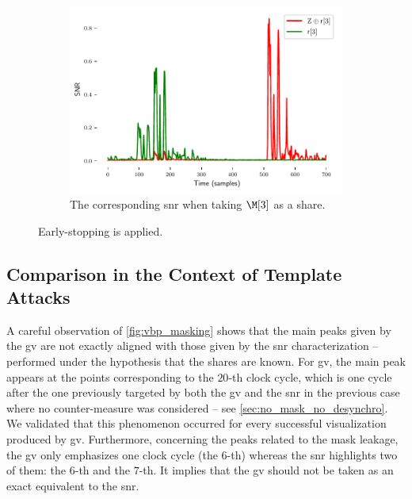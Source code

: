 \begin{figure}
    \begin{subfigure}{0.49 \textwidth}
        \includegraphics[width=\textwidth]{figures/ASCAD_700/snr_r3}
        \caption{The corresponding \gls{snr} when taking \(\M[3]\) as a share.}
        \label{fig:vbp_masking_snr_r3}
    \end{subfigure}
	\caption{Early-stopping is applied.}
	\label{fig:vbp_masking}
\end{figure}

\subsection{Comparison in the Context of Template Attacks}
\label{sec:comparison_with_snr}
A careful observation of \autoref{fig:vbp_masking} shows that the main peaks given by the \gls{gv} are not exactly aligned with those given by the \gls{snr} characterization -- performed under the hypothesis that the shares are known.
For \gls{gv}, the main peak appears at the points corresponding to the \(20\)-th clock cycle, which is one cycle after the one previously targeted by both the \gls{gv} and the \gls{snr} in the previous case where no counter-measure was considered -- see \autoref{sec:no_mask_no_desynchro}.
We validated that this phenomenon occurred for every successful visualization produced by \gls{gv}. 
Furthermore, concerning the peaks related to the mask leakage, the \gls{gv} only emphasizes one clock cycle (the \(6\)-th) whereas the \gls{snr} highlights two of them: the \(6\)-th and the \(7\)-th.
It implies that the \gls{gv} should not be taken as an exact equivalent to the \gls{snr}.

